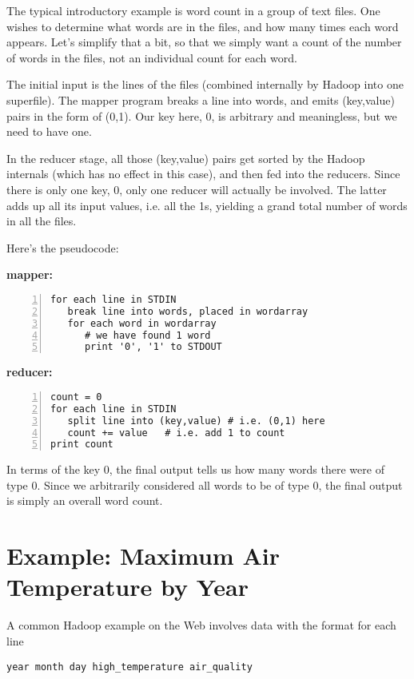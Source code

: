 The typical introductory example is word count in a group of text files.
One wishes to determine what words are in the files, and how many times
each word appears.  Let's simplify that a bit, so that we simply want a
count of the number of words in the files, not an individual count for
each word.

The initial input is the lines of the files (combined internally by
Hadoop into one superfile).  The mapper program breaks a line into
words, and emits (key,value) pairs in the form of (0,1).  Our key here,
0, is arbitrary and meaningless, but we need to have one.

In the reducer stage, all those (key,value) pairs get sorted by the
Hadoop internals (which has no effect in this case), and then fed into
the reducers.  Since there is only one key, 0, only one reducer will
actually be involved.  The latter adds up all its input values, i.e. all
the 1s, yielding a grand total number of words in all the files.

Here's the pseudocode:

{\bf mapper:}

\begin{lstlisting}[numbers=left]
for each line in STDIN
   break line into words, placed in wordarray
   for each word in wordarray
      # we have found 1 word
      print '0', '1' to STDOUT  
\end{lstlisting}

{\bf reducer:}

\begin{lstlisting}[numbers=left]
count = 0
for each line in STDIN
   split line into (key,value) # i.e. (0,1) here
   count += value   # i.e. add 1 to count
print count  
\end{lstlisting}

In terms of the key 0, the final output tells us how many words there
were of type 0.  Since we arbitrarily considered all words to be of type
0, the final output is simply an overall word count.

\section{Example:  Maximum Air Temperature by Year}

A common Hadoop example on the Web involves data with the format for
each line

\begin{lstlisting}
year month day high_temperature air_quality
\end{lstlisting}

